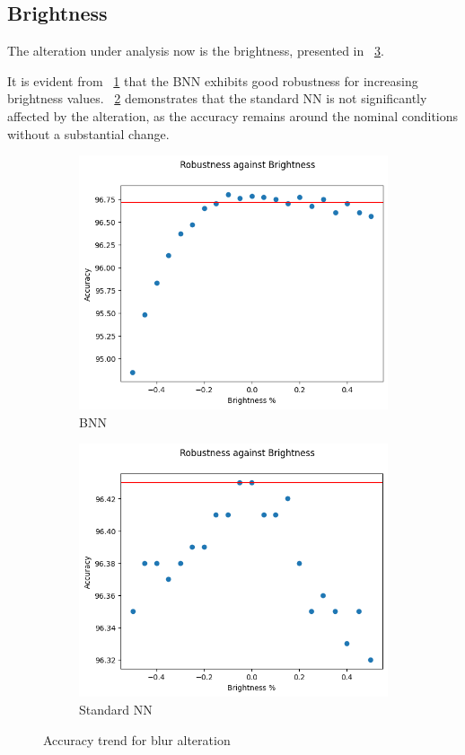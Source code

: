 \subsection{Brightness}

The alteration under analysis now is the brightness, presented in \Fig~\ref{fig:acc_br_wu}.

It is evident from \Fig~\ref{fig:br_acc_wu_bnn} that the BNN exhibits good robustness for increasing brightness values. \Fig~\ref{fig:brightness_ann} demonstrates that the standard NN is not significantly affected by the alteration, as the accuracy remains around the nominal conditions without a substantial change.

\begin{figure}[h]
	\centering
	\begin{subfigure}{.5\textwidth}
		\centering
		\includegraphics[width=0.8\linewidth]{ImageFiles/EvalBNN/BR/WU/acc}
		\caption{BNN}
		\label{fig:br_acc_wu_bnn}
	\end{subfigure}%
	\begin{subfigure}{.5\textwidth}
		\centering
		\includegraphics[width=0.8\linewidth]{ImageFiles/EvalANN/brightness_ann}
		\caption{Standard NN}
		\label{fig:brightness_ann}
	\end{subfigure}
	\caption{Accuracy trend for blur alteration}
	\label{fig:acc_br_wu}
\end{figure}

